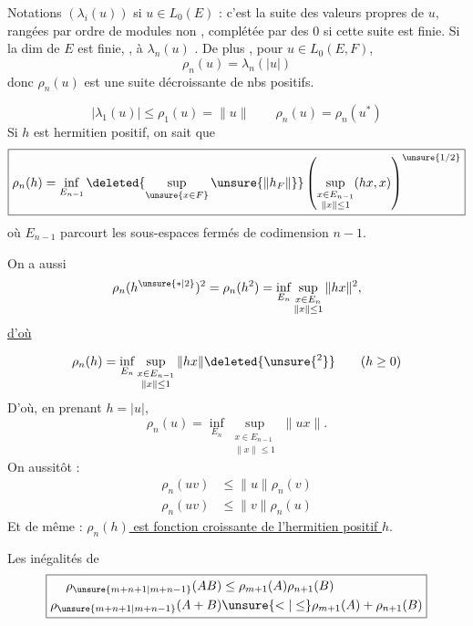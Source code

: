 
Notations $(\lambda_i(u))$ si $u\in L_0(E)$ : c'est la suite des valeurs  propres de $u$, rangées par ordre de modules non , complétée par des $0$ si cette suite est finie.
Si la dim de $E$ est finie, ,    à $\lambda_n(u)$    .
De plus , pour $u\in L_0(E,F)$,
\[
\boxed{\rho_n(u)=\lambda_n(|u|)}
\]
donc $\rho_n(u)$ est une suite décroissante de nbs positifs.

\qquad{}
\[
\boxed{|\lambda_1(u)|\leq\rho_1(u)=\|u\|}\qquad
\boxed{\rho_n(u)=\rho_n(u^*)}
\]
Si $h$ est hermitien positif, on sait que
\[
\boxed{\rho_n(h)=\inf_{E_{n-1}}\deleted{\sup_{\unsure{x\in F}}\unsure{\|h_F\|}}\left(\sup_{\substack{x\in E_{n-1}\\\|x\|\leq1}}(hx,x)\right)^{\unsure{1/2}}}
\]
où  $E_{n-1}$ parcourt  les sous-espaces  fermés de codimension $n-1$.

On a aussi
\[
\rho_n(h^{\unsure{*|2}})^2=\rho_n(h^2)=\inf_{E_n}\sup_{\substack{x\in E_n\\\|x\|\leq1}}\|hx\|^2,
\]
\uline{d'où}

\[
\rho_n(h)=\inf_{E_n}\sup_{\substack{x\in E_{n-1}\\\|x\|\leq1}}\|hx\|\deleted{\unsure{{}^2}}\qquad(h\geq0)
\]
D'où, en prenant $h=|u|$,
\[
\boxed{\rho_n(u)=\inf_{E_n}\sup_{\substack{x\in E_{n-1}\\\|x\|\leq1}}\|ux\|}.
\]
On   aussitôt :
\[
\boxed{\begin{aligned}
\rho_n(uv)&\leq\|u\|\rho_n(v)\\
\rho_n(uv)&\leq\|v\|\rho_n(u)
\end{aligned}}
\]
Et de même : \uline{$\rho_n(h)$ est fonction croissante de l'hermitien positif $h$}.

Les inégalités de 
\[
\boxed{\begin{aligned}
\rho_{\unsure{m+n+1|m+n-1}}(AB)&\leq\rho_{m+1}(A)\rho_{n+1}(B)\\
\rho_{\unsure{m+n+1|m+n-1}}(A+B)&\unsure{<|\leq}\rho_{m+1}(A)+\rho_{n+1}(B)
\end{aligned}}
\]
